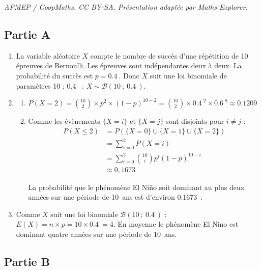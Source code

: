 \documentclass[10pt]{article}
\providecommand{\np}[2][]{{#2~#1}}
\begin{document}
\noindent\textit{APMEP / CoopMaths. CC BY-SA. Présentation adaptée par Maths Explorer.}\par\medskip
\subsection*{Partie A}

\begin{enumerate}
	\item La variable aléatoire $X$ compte le nombre de succès d'une répétition de 10 épreuves de Bernoulli. Les épreuves sont indépendantes deux à deux. La probabilité du succès est $p=\np{0.4}$. Donc $X$ suit une loi binomiale de paramètres 10 ; \np{0.4} : $X \sim \mathcal{B}(10~;~\np{0.4})$.
	\item
		\begin{enumerate}
			\item $P(X = 2) = \binom{10}{2}\times p^2\times(1-p)^{10-2}= \binom{10}{2}\times\np{0.4}^{2}\times \np{0.6}^{8} \approx \np{0.1209}$
			\item Comme les évènements $\{X = i\}$ et $\{X = j\}$ sont disjoints pour $i \neq j$ :
\[
\begin{aligned}
P(X \leqslant 2)
&= P(\{X = 0\} \cup \{X = 1\} \cup \{X = 2\}) \\
&= \sum_{i=0}^{2} P(X=i) \\
&= \sum_{i=0}^{2}\binom{10}{i} p^{i}(1-p)^{10-i} \\
&\approx 0{,}1673
\end{aligned}
\]
			
			La probabilité que le phénomène El Niño soit dominant au plus deux années sur une période de 10~ans est d'environ \np{0.1673}.
		\end{enumerate}
	\item Comme $X$ suit une loi binomiale $\mathcal{B}(10~;~\np{0.4})$ : $E(X) = n\times p = 10 \times \np{0.4} = 4$. En moyenne le phénomène El Nino est dominant quatre années sur une période de 10~ans.
\end{enumerate}

\subsection*{Partie B}
\end{document}
